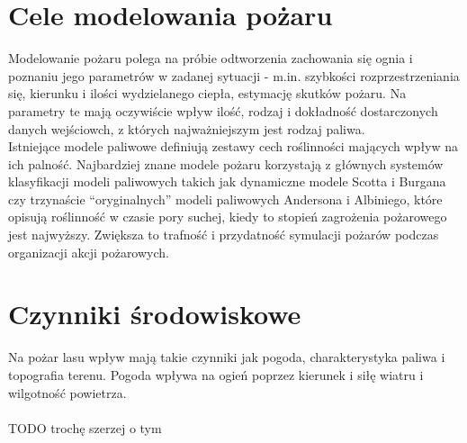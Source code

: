\documentclass[a4paper, 11pt]{article}
\begin{document}
	\section*{Cele modelowania pożaru}
	 \indent
Modelowanie pożaru polega na próbie odtworzenia zachowania się ognia i poznaniu jego parametrów w zadanej sytuacji - m.in. szybkości rozprzestrzeniania się, kierunku i ilości wydzielanego ciepła, estymację skutków pożaru. Na parametry te mają oczywiście wpływ ilość, rodzaj i dokładność dostarczonych danych wejściowch, z których najważniejszym jest rodzaj paliwa. \\
 \indent Istniejące modele paliwowe definiują zestawy cech roślinności mających wpływ na ich palność. Najbardziej znane modele pożaru korzystają z głównych systemów klasyfikacji modeli paliwowych takich jak dynamiczne modele Scotta i Burgana czy trzynaście ``oryginalnych'' modeli paliwowych Andersona i Albiniego, które opisują roślinność w czasie pory suchej, kiedy to stopień zagrożenia pożarowego jest najwyższy. Zwiększa to trafność i przydatność symulacji pożarów podczas organizacji akcji pożarowych.
	 
	
	
	
	
	
	
	
	
	\section*{Czynniki środowiskowe}
	\indent 
	
		Na pożar lasu wpływ mają takie czynniki jak pogoda, charakterystyka paliwa i topografia terenu.	Pogoda wpływa na ogień poprzez kierunek i siłę wiatru i wilgotność powietrza.
		\\ \\TODO trochę szerzej o tym
\end{document}
